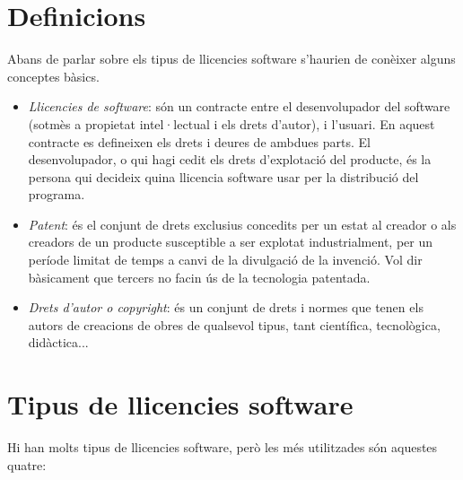 \section{Definicions}
Abans de parlar sobre els tipus de llicencies software s'haurien 
de conèixer alguns conceptes bàsics.

\begin {itemize}
	\item \emph{Llicencies de software}: són un contracte entre el desenvolupador 
	del software (sotmès a propietat intel·lectual i els drets d'autor), i l'usuari. 
	En aquest contracte es defineixen els drets i deures de ambdues parts. El 
	desenvolupador, o qui hagi cedit els drets d'explotació del producte, és 
	la persona qui decideix quina llicencia software usar per la distribució del 
	programa.
	\item \emph{Patent}: és el conjunt de drets exclusius concedits per un estat al 
	creador o als creadors de un producte susceptible a ser explotat industrialment, 
	per un període limitat de temps a canvi de la divulgació de la invenció. Vol dir
	bàsicament que tercers no facin ús de la tecnologia patentada. \cite {definicions}
	\item \emph{Drets d'autor o \textit{copyright}}: és un conjunt de drets i normes \cite {copyright}
	que tenen els autors de creacions de obres de qualsevol tipus, tant científica, 
	tecnològica, didàctica...
\end {itemize}

\section{Tipus de llicencies software}
Hi han molts tipus de llicencies software, però les més utilitzades són aquestes quatre:

